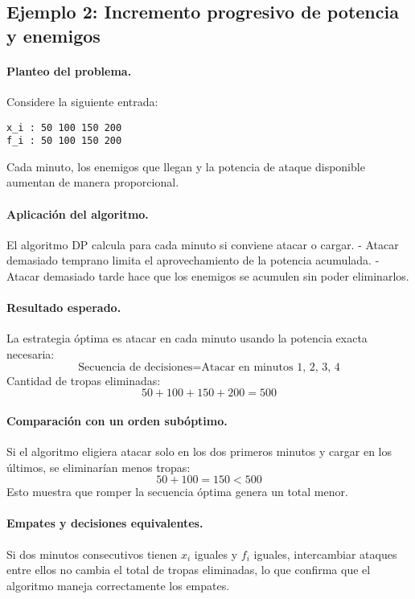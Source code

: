 \subsection{Ejemplo 2: Incremento progresivo de potencia y enemigos}

\paragraph{Planteo del problema.}  
Considere la siguiente entrada:
\begin{verbatim}
x_i : 50 100 150 200
f_i : 50 100 150 200
\end{verbatim}
Cada minuto, los enemigos que llegan y la potencia de ataque disponible aumentan de manera proporcional.

\paragraph{Aplicación del algoritmo.}  
El algoritmo DP calcula para cada minuto si conviene atacar o cargar.  
- Atacar demasiado temprano limita el aprovechamiento de la potencia acumulada.  
- Atacar demasiado tarde hace que los enemigos se acumulen sin poder eliminarlos.  

\paragraph{Resultado esperado.}  
La estrategia óptima es atacar en cada minuto usando la potencia exacta necesaria:
\[
\text{Secuencia de decisiones} = \text{Atacar en minutos 1, 2, 3, 4}
\]
Cantidad de tropas eliminadas:
\[
50 + 100 + 150 + 200 = 500
\]

\paragraph{Comparación con un orden subóptimo.}  
Si el algoritmo eligiera atacar solo en los dos primeros minutos y cargar en los últimos, se eliminarían menos tropas:
\[
50 + 100 = 150 < 500
\]
Esto muestra que romper la secuencia óptima genera un total menor.

\paragraph{Empates y decisiones equivalentes.}  
Si dos minutos consecutivos tienen $x_i$ iguales y $f_i$ iguales, intercambiar ataques entre ellos no cambia el total de tropas eliminadas, lo que confirma que el algoritmo maneja correctamente los empates.
